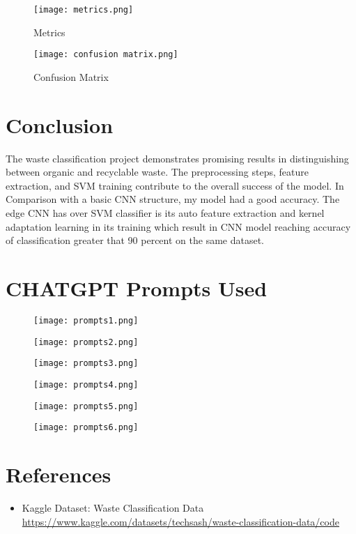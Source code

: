 \documentclass{article}
\begin{document}
\begin{figure}[H]
  \centering
  \texttt{[image: metrics.png]}
  \caption{Metrics}
  \label{fig:Metrics: Accuracy, Precision, Recall, F1 Score}
\end{figure}

\begin{figure}[H]
  \centering
  \texttt{[image: confusion matrix.png]}
  \caption{Confusion Matrix}
  \label{fig:Confusion Matrix}
\end{figure}

\section{Conclusion}
The waste classification project demonstrates promising results in distinguishing between organic and recyclable waste. The preprocessing steps, feature extraction, and SVM training contribute to the overall success of the model. In Comparison with a basic CNN structure, my model had a good accuracy. The edge CNN has over SVM classifier is its auto feature extraction and kernel adaptation learning in its training which result in CNN model reaching accuracy of classification greater that 90 percent on the same dataset.

\section{CHATGPT Prompts Used}
\begin{figure}[H]
  \centering
  \texttt{[image: prompts1.png]}
  \caption{}
  \label{fig:Prompts List 1}
\end{figure}
\begin{figure}[H]
  \centering
  \texttt{[image: prompts2.png]}
  \caption{}
  \label{fig:Prompts List 2}
\end{figure}
\begin{figure}[H]
  \centering
  \texttt{[image: prompts3.png]}
  \caption{}
  \label{fig:Prompts List 3}
\end{figure}
\begin{figure}[H]
  \centering
  \texttt{[image: prompts4.png]}
  \caption{}
  \label{fig:Prompts List 4}
\end{figure}
\begin{figure}[H]
  \centering
  \texttt{[image: prompts5.png]}
  \caption{}
  \label{fig:Prompts List 5}
\end{figure}
\begin{figure}[H]
  \centering
  \texttt{[image: prompts6.png]}
  \caption{}
  \label{fig:Prompts List 6}
\end{figure}
\section{References}
\begin{itemize}
    \item Kaggle Dataset: Waste Classification Data \\
          \url{https://www.kaggle.com/datasets/techsash/waste-classification-data/code}
\end{itemize}
\end{document}
